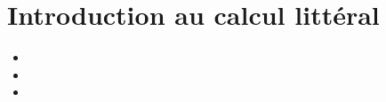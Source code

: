 \chapter{Introduction au calcul littéral}\label{ChCalculLitteral}

\vspace{5cm}
\begin{acquis}
\begin{itemize}
\item 
\item 
\item 
\end{itemize}
\end{acquis}


\activites  


\cours


\exercicesbase
\begin{colonne*exercice}

\end{colonne*exercice}


%

%

%

%


